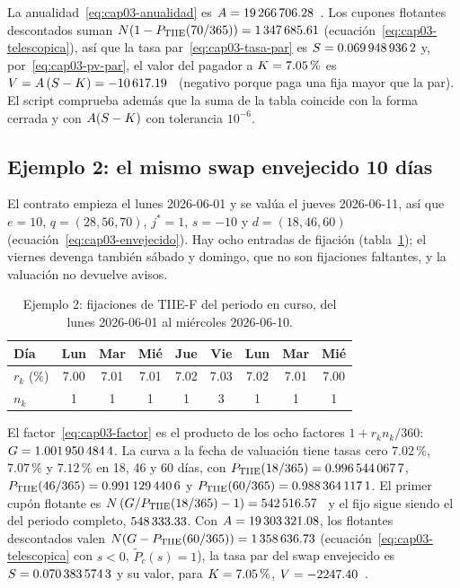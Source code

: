 La anualidad~\eqref{eq:cap03-anualidad} es $\Ann=\verif{cap03-anualidad}{19266706.28}$~\MXN{}. Los cupones
flotantes descontados suman $\Nom(1-\DF{\cTIIE}{70/365})=\verif{cap03-flotante-telescopica}{1347685.61}$
(ecuación~\eqref{eq:cap03-telescopica}), así que la tasa par~\eqref{eq:cap03-tasa-par} es
$\Spar=\verif{cap03-tasa-par}{0.0699489362}$ y, por~\eqref{eq:cap03-pv-par}, el valor del pagador a
$\K=7.05\,\%$ es $\PV=\Ann\,(\Spar-\K)=\verif{cap03-pv-pagador}{-10617.19}$~\MXN{} (negativo porque paga una
fija mayor que la par). El script comprueba además que la suma de la tabla coincide con la forma
cerrada y con $\Ann(\Spar-\K)$ con tolerancia $10^{-6}$.

\subsection*{Ejemplo 2: el mismo swap envejecido 10 días}

El contrato empieza el lunes 2026-06-01 y se valúa el jueves 2026-06-11, así que $e=10$, $q=(28,56,70)$,
$j^\ast=1$, $s=-10$ y $d=(18,46,60)$ (ecuación~\eqref{eq:cap03-envejecido}). Hay ocho entradas de fijación
(tabla~\ref{tab:cap03-fijaciones}); el viernes devenga también sábado y domingo, que no son fijaciones
faltantes, y la valuación no devuelve avisos.

\begin{table}[ht]
  \centering
  \caption{Ejemplo 2: fijaciones de TIIE-F del periodo en curso, del lunes 2026-06-01 al miércoles 2026-06-10.}\label{tab:cap03-fijaciones}
  \begin{tabular}{@{}lcccccccc@{}}
    \toprule
    Día & Lun & Mar & Mié & Jue & Vie & Lun & Mar & Mié \\
    \midrule
    $r_k$ (\%) & 7.00 & 7.01 & 7.01 & 7.02 & 7.03 & 7.02 & 7.01 & 7.00 \\
    $n_k$ & 1 & 1 & 1 & 1 & 3 & 1 & 1 & 1 \\
    \bottomrule
  \end{tabular}
\end{table}

El factor~\eqref{eq:cap03-factor} es el producto de los ocho factores $1+r_kn_k/360$:
$G=\verif{cap03-factor-acumulado}{1.0019504844}$. La curva a la fecha de valuación tiene tasas cero
$7.02\,\%$, $7.07\,\%$ y $7.12\,\%$ en 18, 46 y 60 días, con
$\DF{\cTIIE}{18/365}=\verif{cap03-df-env-18}{0.9965440677}$,
$\DF{\cTIIE}{46/365}=\verif{cap03-df-env-46}{0.9911294406}$ y
$\DF{\cTIIE}{60/365}=\verif{cap03-df-env-60}{0.9883641171}$. El primer cupón flotante es
$\Nom\,(G/\DF{\cTIIE}{18/365}-1)=\verif{cap03-flo-env-1}{542516.57}$~\MXN{} y el fijo sigue siendo el del
periodo completo, $\verif{cap03-fij-env-1}{548333.33}$. Con $\Ann=\verif{cap03-anualidad-env}{19303321.08}$, los flotantes
descontados valen $\Nom(G-\DF{\cTIIE}{60/365})=\verif{cap03-flotante-telescopica-env}{1358636.73}$ (ecuación~\eqref{eq:cap03-telescopica} con
$s<0$, $\widetilde P_c(s)=1$), la tasa par del swap envejecido es
$\Spar=\verif{cap03-tasa-par-env}{0.0703835743}$ y su valor, para $\K=7.05\,\%$,
$\PV=\verif{cap03-pv-envejecido}{-2247.40}$~\MXN{}.

